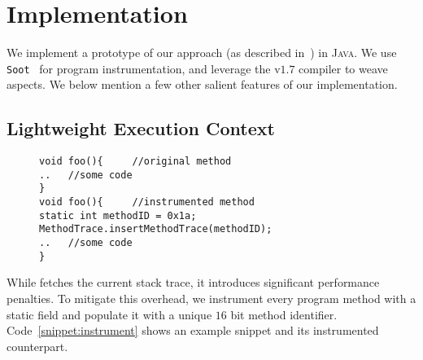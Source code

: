 \section{Implementation}
\label{sec:implementation}


We implement a prototype of our approach (as described in~) 
in \textsc{Java}. We use \texttt{Soot}~\cite{soot} for program instrumentation, 
and leverage the  v$1.7$ compiler to weave aspects. We below mention a 
few other salient features of our implementation.


% 

\subsection{Lightweight Execution Context}
\label{subsec:trace}

 \begin{figure}[t]
\begin{lstlisting}
void foo(){		//original method
..   //some code
}
void foo(){		//instrumented method
static int methodID = 0x1a;
MethodTrace.insertMethodTrace(methodID);
..   //some code
}
\end{lstlisting}
\end{figure}

While  fetches the current stack trace, it introduces 
significant performance penalties. To mitigate this overhead, we instrument 
every program method with a static  field and populate it with a 
unique $16$ bit method identifier. Code~\ref{snippet:instrument} shows an 
example snippet and its instrumented counterpart.
% 
% 

